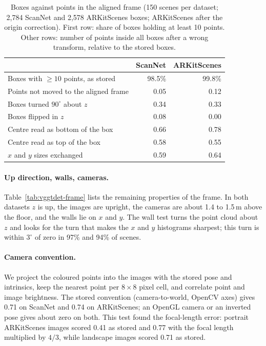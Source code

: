 \begin{table}[t]
\centering
\caption{Boxes against points in the aligned frame (150 scenes per dataset; 2,784 ScanNet and 2,578
ARKitScenes boxes; ARKitScenes after the origin correction). First row: share of boxes holding at least 10
points. Other rows: number of points inside all boxes after a wrong transform, relative to the stored boxes.}
\label{tab:vggtdet-occ}
\begin{tabular}{lrr}
\toprule
 & ScanNet & ARKitScenes \\
\midrule
Boxes with $\geq 10$ points, as stored      & 98.5\% & 99.8\% \\
\midrule
Points not moved to the aligned frame       & 0.05 & 0.12 \\
Boxes turned $90^\circ$ about $z$           & 0.34 & 0.33 \\
Boxes flipped in $z$                        & 0.08 & 0.00 \\
Centre read as bottom of the box            & 0.66 & 0.78 \\
Centre read as top of the box               & 0.58 & 0.55 \\
$x$ and $y$ sizes exchanged                 & 0.59 & 0.64 \\
\bottomrule
\end{tabular}
\end{table}

\paragraph{Up direction, walls, cameras.}
Table~\ref{tab:vggtdet-frame} lists the remaining properties of the frame. In both datasets $z$ is up, the
images are upright, the cameras are about 1.4 to 1.5\,m above the floor, and the walls lie on $x$ and $y$. The
wall test turns the point cloud about $z$ and looks for the turn that makes the $x$ and $y$ histograms
sharpest; this turn is within $3^\circ$ of zero in 97\% and 94\% of scenes.

\paragraph{Camera convention.}
We project the coloured points into the images with the stored pose and intrinsics, keep the nearest point
per $8\times8$ pixel cell, and correlate point and image brightness. The stored convention (camera-to-world,
OpenCV axes) gives 0.71 on ScanNet and 0.74 on ARKitScenes; an OpenGL camera or an inverted pose gives about
zero on both. This test found the focal-length error: portrait ARKitScenes images scored 0.41 as stored and
0.77 with the focal length multiplied by $4/3$, while landscape images scored 0.71 as stored.

